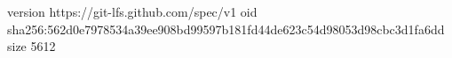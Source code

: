 version https://git-lfs.github.com/spec/v1
oid sha256:562d0e7978534a39ee908bd99597b181fd44de623c54d98053d98cbc3d1fa6dd
size 5612
